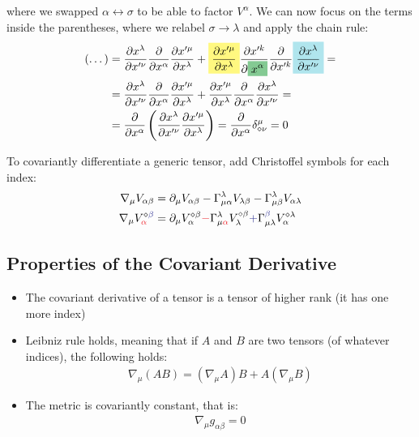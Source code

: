 \documentclass[../template.tex]{subfiles}
\begin{document}
where we swapped $\alpha \leftrightarrow \sigma$ to be able to factor $V^\alpha$. We can now focus on the terms inside the parentheses, where we relabel $\sigma \to \lambda$ and apply the  chain rule:
\begin{align*}
    (\dots) &= \pdv{x^\lambda}{x'^\nu} \pdv{x^\alpha} \pdv{x'^\mu}{x^\lambda} + \hlc{Yellow}{\pdv{x'^\mu}{x^\lambda}} \pdv{x'^k}{\hlc{ForestGreen}{x^\alpha}}\pdv{x'^k}\hlc{SkyBlue}{\pdv{x^\lambda}{x'^\nu}} =\\
    &= \pdv{x^\lambda}{x'^\nu} \pdv{x^\alpha} \pdv{x'^\mu}{x^\lambda} + \pdv{x'^\mu}{x^\lambda} \pdv{x^\alpha} \pdv{x^\lambda}{x'^\nu} =\\
    &= \pdv{x^\alpha} \left(\pdv{x^\lambda}{x'^\nu}\pdv{x'^\mu}{x^\lambda}\right) = \pdv{x^\alpha} \delta^\mu_{\diamond \nu} = 0
\end{align*}  

To covariantly differentiate a generic tensor, add Christoffel symbols for each index:
\begin{align*}
    \nabla_\mu V_{\alpha \beta} &= \partial_\mu V_{\alpha \beta} - \Gamma_{\mu \alpha}^\lambda V_{\lambda \beta}  - \Gamma_{\mu \beta}^\lambda V_{\alpha \lambda}\\
    \nabla_\mu V_{\textcolor{Red}{\alpha}}^{\diamond \textcolor{Blue}{\beta}} &= \partial_\mu V_\alpha^{\diamond \beta} \textcolor{Red}{-} \Gamma_{\mu \textcolor{Red}{\alpha}}^\lambda V_\lambda^{\diamond \beta} \textcolor{Blue}{+} \Gamma_{\mu \lambda}^{\textcolor{Blue}{\beta}} V_\alpha^{\diamond \lambda}
\end{align*}

\subsection{Properties of the Covariant Derivative}
\begin{itemize}
    \item The covariant derivative of a tensor is a tensor of higher rank (it has one more index)
    \item Leibniz rule holds, meaning that if $A$ and $B$ are two tensors (of whatever indices), the following holds:  
    \begin{align*}
        \nabla_\mu(A B) = (\nabla_\mu A)B + A(\nabla_\mu B)
    \end{align*}
    \item The metric is covariantly constant, that is:
    \begin{align*}
        \nabla_\mu g_{\alpha \beta} = 0    
    \end{align*}
\end{itemize}
\end{document}
